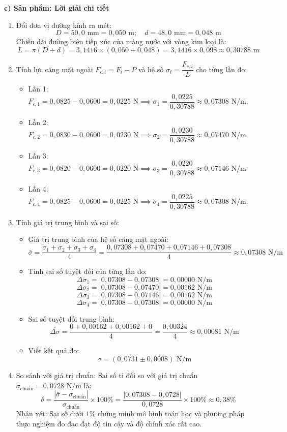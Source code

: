 \documentclass[12pt, a4paper]{article}
\begin{document}
\noindent \textbf{c) Sản phẩm: Lời giải chi tiết}
\begin{enumerate}
    \item Đổi đơn vị đường kính ra mét:
    $$D = 50{,}0\text{ mm} = 0{,}050\text{ m}; \quad d = 48{,}0\text{ mm} = 0{,}048\text{ m}$$
    Chiều dài đường biên tiếp xúc của màng nước với vòng kim loại là:
    $$L = \pi(D + d) = 3{,}1416 \times (0{,}050 + 0{,}048) = 3{,}1416 \times 0{,}098 \approx 0{,}30788\text{ m}$$
    \item Tính lực căng mặt ngoài $F_{c, i} = F_i - P$ và hệ số $\sigma_i = \dfrac{F_{c, i}}{L}$ cho từng lần đo:
    \begin{itemize}
        \item Lần 1: $F_{c, 1} = 0{,}0825 - 0{,}0600 = 0{,}0225\text{ N} \implies \sigma_1 = \dfrac{0{,}0225}{0{,}30788} \approx 0{,}07308\text{ N/m}$.
        \item Lần 2: $F_{c, 2} = 0{,}0830 - 0{,}0600 = 0{,}0230\text{ N} \implies \sigma_2 = \dfrac{0{,}0230}{0{,}30788} \approx 0{,}07470\text{ N/m}$.
        \item Lần 3: $F_{c, 3} = 0{,}0820 - 0{,}0600 = 0{,}0220\text{ N} \implies \sigma_3 = \dfrac{0{,}0220}{0{,}30788} \approx 0{,}07146\text{ N/m}$.
        \item Lần 4: $F_{c, 4} = 0{,}0825 - 0{,}0600 = 0{,}0225\text{ N} \implies \sigma_4 = \dfrac{0{,}0225}{0{,}30788} \approx 0{,}07308\text{ N/m}$.
    \end{itemize}
    \item Tính giá trị trung bình và sai số:
    \begin{itemize}
        \item Giá trị trung bình của hệ số căng mặt ngoài:
        $$\bar{\sigma} = \dfrac{\sigma_1 + \sigma_2 + \sigma_3 + \sigma_4}{4} = \dfrac{0{,}07308 + 0{,}07470 + 0{,}07146 + 0{,}07308}{4} \approx 0{,}07308\text{ N/m}$$
        \item Tính sai số tuyệt đối của từng lần đo:
        $$\Delta \sigma_1 = |0{,}07308 - 0{,}07308| = 0{,}00000\text{ N/m}$$
        $$\Delta \sigma_2 = |0{,}07308 - 0{,}07470| = 0{,}00162\text{ N/m}$$
        $$\Delta \sigma_3 = |0{,}07308 - 0{,}07146| = 0{,}00162\text{ N/m}$$
        $$\Delta \sigma_4 = |0{,}07308 - 0{,}07308| = 0{,}00000\text{ N/m}$$
        \item Sai số tuyệt đối trung bình:
        $$\overline{\Delta \sigma} = \dfrac{0 + 0{,}00162 + 0{,}00162 + 0}{4} = \dfrac{0{,}00324}{4} \approx 0{,}00081\text{ N/m}$$
        \item Viết kết quả đo:
        $$\sigma = (0{,}0731 \pm 0{,}0008)\text{ N/m}$$
    \end{itemize}
    \item So sánh với giá trị chuẩn:
    Sai số tỉ đối so với giá trị chuẩn $\sigma_{\text{chuẩn}} = 0{,}0728\text{ N/m}$ là:
    $$\delta = \dfrac{|\bar{\sigma} - \sigma_{\text{chuẩn}}|}{\sigma_{\text{chuẩn}}} \times 100\% = \dfrac{|0{,}07308 - 0{,}0728|}{0{,}0728} \times 100\% \approx 0{,}38\%$$
    Nhận xét: Sai số dưới $1\%$ chứng minh mô hình toán học và phương pháp thực nghiệm đo đạc đạt độ tin cậy và độ chính xác rất cao.
\end{enumerate}
\end{document}
